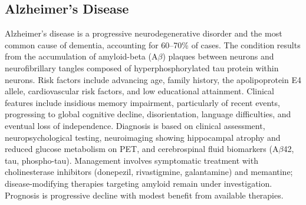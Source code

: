 






\label{sec:Neurodegenerative Diseases}

\subsection{Alzheimer's Disease}
\label{sec:Alzheimer's Disease}
Alzheimer's disease is a progressive neurodegenerative disorder and the most common cause of dementia, accounting for 60--70\% of cases. The condition results from the accumulation of amyloid-beta (A$\beta$) plaques between neurons and neurofibrillary tangles composed of hyperphosphorylated tau protein within neurons. Risk factors include advancing age, family history, the apolipoprotein E4 allele, cardiovascular risk factors, and low educational attainment. Clinical features include insidious memory impairment, particularly of recent events, progressing to global cognitive decline, disorientation, language difficulties, and eventual loss of independence. Diagnosis is based on clinical assessment, neuropsychological testing, neuroimaging showing hippocampal atrophy and reduced glucose metabolism on PET, and cerebrospinal fluid biomarkers (A$\beta$42, tau, phospho-tau). Management involves symptomatic treatment with cholinesterase inhibitors (donepezil, rivastigmine, galantamine) and memantine; disease-modifying therapies targeting amyloid remain under investigation. Prognosis is progressive decline with modest benefit from available therapies.

